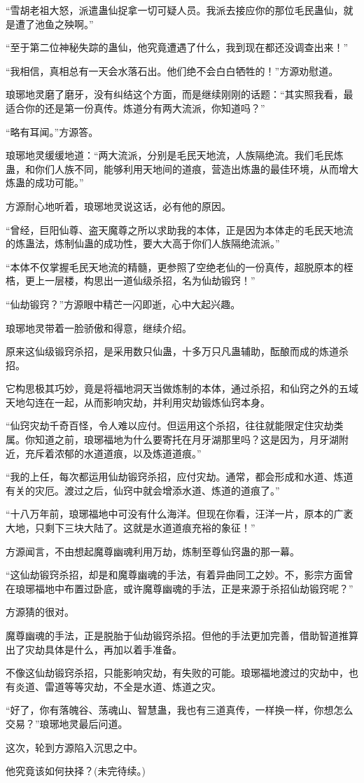 \begin{this_body}
“雪胡老祖大怒，派遣蛊仙捉拿一切可疑人员。我派去接应你的那位毛民蛊仙，就是遭了池鱼之殃啊。”

“至于第二位神秘失踪的蛊仙，他究竟遭遇了什么，我到现在都还没调查出来！”

“我相信，真相总有一天会水落石出。他们绝不会白白牺牲的！”方源劝慰道。

琅琊地灵磨了磨牙，没有纠结这个方面，而是继续刚刚的话题：“其实照我看，最适合你的还是第一份真传。炼道分有两大流派，你知道吗？”

“略有耳闻。”方源答。

琅琊地灵缓缓地道：“两大流派，分别是毛民天地流，人族隔绝流。我们毛民炼蛊，和你们人族不同，能够利用天地间的道痕，营造出炼蛊的最佳环境，从而增大炼蛊的成功可能。”

方源耐心地听着，琅琊地灵说这话，必有他的原因。

“曾经，巨阳仙尊、盗天魔尊之所以求助我的本体，正是因为本体走的毛民天地流的炼蛊法，炼制仙蛊的成功性，要大大高于你们人族隔绝流派。”

“本体不仅掌握毛民天地流的精髓，更参照了空绝老仙的一份真传，超脱原本的桎梏，更上一层楼，构思出一道仙级杀招，名为仙劫锻窍！”

“仙劫锻窍？”方源眼中精芒一闪即逝，心中大起兴趣。

琅琊地灵带着一脸骄傲和得意，继续介绍。

原来这仙级锻窍杀招，是采用数只仙蛊，十多万只凡蛊辅助，酝酿而成的炼道杀招。

它构思极其巧妙，竟是将福地洞天当做炼制的本体，通过杀招，和仙窍之外的五域天地勾连在一起，从而影响灾劫，并利用灾劫锻炼仙窍本身。

“仙窍灾劫千奇百怪，令人难以应付。但运用这个杀招，往往就能限定住灾劫类属。你知道之前，琅琊福地为什么要寄托在月牙湖那里吗？这是因为，月牙湖附近，充斥着浓郁的水道道痕，以及炼道道痕。”

“我的上任，每次都运用仙劫锻窍杀招，应付灾劫。通常，都会形成和水道、炼道有关的灾厄。渡过之后，仙窍中就会增添水道、炼道的道痕了。”

“十八万年前，琅琊福地中可没有什么海洋。但现在你看，汪洋一片，原本的广袤大地，只剩下三块大陆了。这就是水道道痕充裕的象征！”

方源闻言，不由想起魔尊幽魂利用万劫，炼制至尊仙窍蛊的那一幕。

“这仙劫锻窍杀招，却是和魔尊幽魂的手法，有着异曲同工之妙。不，影宗方面曾在琅琊福地中布置过卧底，或许魔尊幽魂的手法，正是来源于杀招仙劫锻窍呢？”

方源猜的很对。

魔尊幽魂的手法，正是脱胎于仙劫锻窍杀招。但他的手法更加完善，借助智道推算出了灾劫具体是什么，再加以着手准备。

不像这仙劫锻窍杀招，只能影响灾劫，有失败的可能。琅琊福地渡过的灾劫中，也有炎道、雷道等等灾劫，不全是水道、炼道之灾。

“好了，你有落魄谷、荡魂山、智慧蛊，我也有三道真传，一样换一样，你想怎么交易？”琅琊地灵最后问道。

这次，轮到方源陷入沉思之中。

他究竟该如何抉择？(未完待续。)

\end{this_body}

